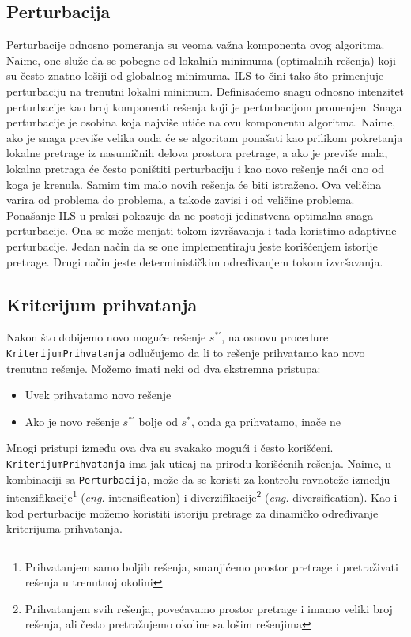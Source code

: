 \documentclass[a4paper]{article}
\newcommand{\sstar}[0]{$\textit{s}^*$}
\newcommand{\eng}[1]{(\textit{eng.} #1)}
\newcommand{\kriterijum}[0]{\small{\texttt{KriterijumPrihvatanja}}}
\newcommand{\perturbacija}[0]{\small{\texttt{Perturbacija}}}
\begin{document}
\subsection{Perturbacija}

Perturbacije odnosno pomeranja su veoma važna komponenta ovog algoritma. Naime, one služe da se pobegne od lokalnih minimuma (optimalnih rešenja) koji su često 
znatno lošiji od globalnog minimuma. ILS to čini tako što primenjuje perturbaciju na trenutni lokalni minimum. Definisaćemo snagu odnosno intenzitet perturbacije 
kao broj komponenti rešenja koji je perturbacijom promenjen. Snaga perturbacije je osobina koja najviše utiče na ovu komponentu algoritma. Naime, ako je snaga previše velika 
onda će se algoritam ponašati kao prilikom pokretanja lokalne pretrage iz nasumičnih delova prostora pretrage, a ako je previše mala, lokalna pretraga će često 
poništiti perturbaciju i kao novo rešenje 
naći ono od koga je krenula. Samim tim malo novih rešenja će biti istraženo. Ova veličina varira od problema do problema, a takođe zavisi i od veličine problema. 
Ponašanje ILS u praksi pokazuje da ne postoji jedinstvena optimalna snaga perturbacije. Ona se može menjati tokom izvršavanja i tada koristimo adaptivne perturbacije. 
Jedan način da se one implementiraju jeste korišćenjem istorije pretrage. Drugi način jeste determinističkim određivanjem tokom izvršavanja.

\subsection{Kriterijum prihvatanja}

Nakon što dobijemo novo moguće rešenje $\textit{s}^{*\prime}$, na osnovu procedure \kriterijum{} odlučujemo da li to rešenje prihvatamo kao novo trenutno rešenje. 
Možemo imati neki od dva ekstremna pristupa:
\begin{itemize}
  \item Uvek prihvatamo novo rešenje
  \item Ako je novo rešenje $\textit{s}^{*\prime}$ bolje od \sstar{}, onda ga prihvatamo, inače ne
\end{itemize}
Mnogi pristupi između ova dva su svakako mogući i često korišćeni. \\
\kriterijum{} ima jak uticaj na prirodu korišćenih rešenja. Naime, u kombinaciji sa \perturbacija{}, može da se 
koristi za kontrolu ravnoteže izmedju intenzifikacije\footnote{Prihvatanjem samo boljih rešenja, smanjićemo prostor pretrage i pretraživati rešenja u trenutnoj okolini} \eng{intensification} 
i diverzifikacije\footnote{Prihvatanjem svih rešenja, povećavamo prostor pretrage i imamo veliki broj rešenja, ali često pretražujemo okoline sa lošim rešenjima} \eng{diversification}. Kao i kod perturbacije 
možemo koristiti istoriju pretrage za dinamičko određivanje kriterijuma prihvatanja.
\end{document}
